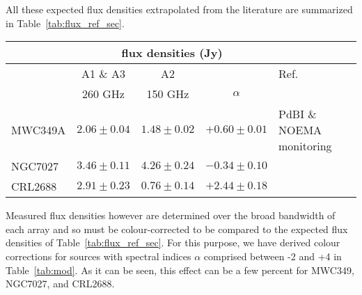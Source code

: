All these expected flux densities extrapolated from the literature are
summarized in Table~\ref{tab:flux_ref_sec}.


\begin{table*}[!thbp]
  \caption[Reference flux densities of secondary calibrators]{Reference flux densities of secondary calibrators at the NIKA2 reference frequencies 150 and 260 GHz. Uncertainties of flux densities extrapolated
    at 150 and 260 GHz include contribution of the uncertainty on the spectral index $\alpha$, which is defined as $S_{\nu} \propto \nu^{\alpha}$.}
  \label{tab:flux_ref_sec}
  \centering    
  \begin{tabular}{|l|c|c|c|l|}
    \hline\hline
    \multicolumn{1}{|c}{}  & \multicolumn{3}{|c}{flux  densities (Jy)} & \multicolumn{1}{|c|}{}  \\
    \hline
    &    A1 \& A3       &  A2             &            &   Ref. \\
    &  260 GHz          &  150 GHz        & $\alpha$ &      \\
    \hline
    MWC349A   &   $2.06\pm0.04$  &  $1.48\pm0.02$ &  $+0.60\pm0.01$      &  PdBI \& NOEMA monitoring  \\
    NGC7027  &   $3.46\pm0.11$   &  $4.26\pm0.24$  &  $-0.34\pm0.10$     &  \citet{Hoare1992}      \\
    CRL2688  &   $2.91\pm0.23$   &  $0.76\pm0.14$  &  $+2.44\pm0.18$     &  \citet{Dempsey2013_SCUBA2} \\
    \hline
  \end{tabular}
\end{table*}


Measured flux densities however are determined over the broad
bandwidth of each array and so must be colour-corrected to be compared
to the expected flux densities of Table~\ref{tab:flux_ref_sec}.  For
this purpose, we have derived colour corrections for sources with spectral
indices $\alpha$ comprised between -2 and +4 in Table~\ref{tab:mod}. %
As it can be seen, this effect can be a few percent for MWC349, NGC7027, and CRL2688.

